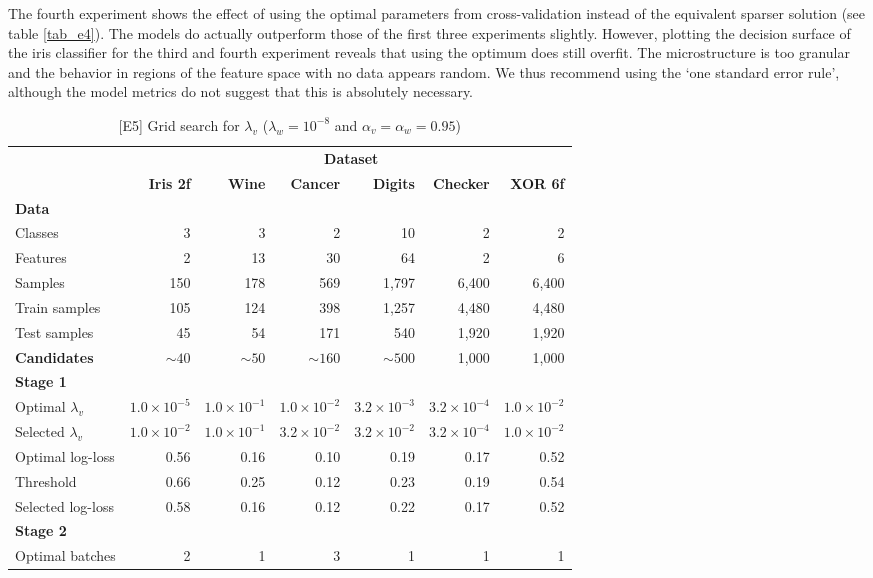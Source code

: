 %
The fourth experiment shows the effect of using the optimal parameters from cross-validation instead of the equivalent sparser solution (see table \ref{tab_e4}).
The models do actually outperform those of the first three experiments slightly.
However, plotting the decision surface of the iris classifier for the third and fourth experiment reveals that using the optimum does still overfit.
The microstructure is too granular and the behavior in regions of the feature space with no data appears random.
We thus recommend using the `one standard error rule', although the model metrics do not suggest that this is absolutely necessary.\par
%
\begin{table}
\caption{[E5] Grid search for $\lambda_v$ ($\lambda_w=10^{-8}$ and $\alpha_v=\alpha_w=0.95$)}
\label{tab_e5}
%
\begin{center}
\small
\begin{tabular}{|lrrrrrr|}
\hline
&\multicolumn{6}{c|}{\textbf{\hrulefill\ Dataset \hrulefill}}\\
&\textbf{Iris 2f}&\textbf{Wine}&\textbf{Cancer}&\textbf{Digits}&\textbf{Checker}&\textbf{XOR 6f}\\
\multicolumn{7}{|l|}{\textbf{Data}}\\
Classes&3&3&2&10&2&2\\
Features&2&13&30&64&2&6\\
Samples&150&178&569&1,797&6,400&6,400\\
Train samples&105&124&398&1,257&4,480&4,480\\
Test samples&45&54&171&540&1,920&1,920\\
\textbf{Candidates}&$\sim40$&$\sim50$&$\sim160$&$\sim500$&1,000&1,000\\
\multicolumn{7}{|l|}{\textbf{Stage 1}}\\
Optimal $\lambda_v$&$1.0\times10^{-5}$&$1.0\times10^{-1}$&$1.0\times10^{-2}$&$3.2\times10^{-3}$&$3.2\times10^{-4}$&$1.0\times10^{-2}$\\
Selected $\lambda_v$&$1.0\times10^{-2}$&$1.0\times10^{-1}$&$3.2\times10^{-2}$&$3.2\times10^{-2}$&$3.2\times10^{-4}$&$1.0\times10^{-2}$\\
Optimal log-loss&0.56&0.16&0.10&0.19&0.17&0.52\\
Threshold&0.66&0.25&0.12&0.23&0.19&0.54\\
Selected log-loss&0.58&0.16&0.12&0.22&0.17&0.52\\
\multicolumn{7}{|l|}{\textbf{Stage 2}}\\
Optimal batches&2&1&3&1&1&1\\

\end{tabular}
\end{center}
\end{table}
